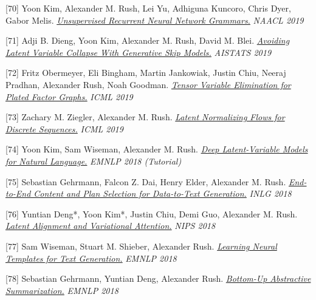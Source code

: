 \documentclass[10pt]{article}
\begin{document}
\medskip


[70] \ind Yoon Kim, Alexander M. Rush, Lei Yu, Adhiguna Kuncoro, Chris Dyer, Gabor Melis. \emph{\href{ https://arxiv.org/pdf/1904.03746.pdf }{ Unsupervised Recurrent Neural Network Grammars.} }\emph{ NAACL 2019 }

\medskip


[71] \ind Adji B. Dieng, Yoon Kim, Alexander M. Rush, David M. Blei. \emph{\href{ https://arxiv.org/pdf/1807.04863.pdf }{ Avoiding Latent Variable Collapse With Generative Skip Models.} }\emph{ AISTATS 2019 }

\medskip


[72] \ind Fritz Obermeyer, Eli Bingham, Martin Jankowiak, Justin Chiu, Neeraj Pradhan, Alexander Rush, Noah Goodman. \emph{\href{ https://arxiv.org/pdf/1902.03210.pdf }{ Tensor Variable Elimination for Plated Factor Graphs.} }\emph{ ICML 2019 }

\medskip


[73] \ind Zachary M. Ziegler, Alexander M. Rush. \emph{\href{ https://arxiv.org/pdf/1901.10548 }{ Latent Normalizing Flows for Discrete Sequences.} }\emph{ ICML 2019 }

\medskip


[74] \ind Yoon Kim, Sam Wiseman, Alexander M. Rush. \emph{\href{ https://github.com/harvardnlp/DeepLatentNLP/raw/master/tutorial_deep_latent.pdf }{ Deep Latent-Variable Models for Natural Language.} }\emph{ EMNLP 2018 (Tutorial) }

\medskip


[75] \ind Sebastian Gehrmann, Falcon Z. Dai, Henry Elder, Alexander M. Rush. \emph{\href{ https://arxiv.org/pdf/1810.04700 }{ End-to-End Content and Plan Selection for Data-to-Text Generation.} }\emph{ INLG 2018 }

\medskip


[76] \ind Yuntian Deng*, Yoon Kim*, Justin Chiu, Demi Guo, Alexander M. Rush. \emph{\href{ https://arxiv.org/pdf/1807.03756.pdf }{ Latent Alignment and Variational Attention.} }\emph{ NIPS 2018 }

\medskip


[77] \ind Sam Wiseman, Stuart M. Shieber, Alexander Rush. \emph{\href{ https://arxiv.org/abs/1808.10122 }{ Learning Neural Templates for Text Generation.} }\emph{ EMNLP 2018 }

\medskip


[78] \ind Sebastian Gehrmann, Yuntian Deng, Alexander Rush. \emph{\href{ https://arxiv.org/abs/1808.10792 }{ Bottom-Up Abstractive Summarization.} }\emph{ EMNLP 2018 }
\end{document}
